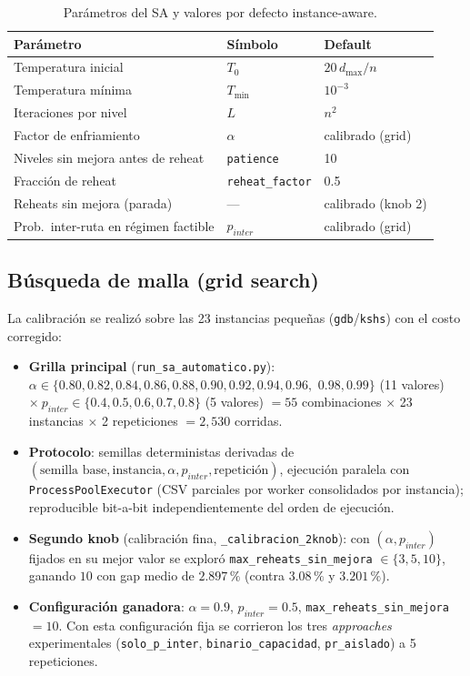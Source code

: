 \begin{table}[htbp]
\centering
\caption{Parámetros del SA y valores por defecto instance-aware.}
\begin{tabular}{lll}
\toprule
Parámetro & Símbolo & Default \\
\midrule
Temperatura inicial & $T_0$ & $20\, d_{\max}/n$ \\
Temperatura mínima & $T_{\min}$ & $10^{-3}$ \\
Iteraciones por nivel & $L$ & $n^2$ \\
Factor de enfriamiento & $\alpha$ & calibrado (grid) \\
Niveles sin mejora antes de reheat & \texttt{patience} & 10 \\
Fracción de reheat & \texttt{reheat\_factor} & 0.5 \\
Reheats sin mejora (parada) & --- & calibrado (knob 2) \\
Prob.\ inter-ruta en régimen factible & $p_{inter}$ & calibrado (grid) \\
\bottomrule
\end{tabular}
\end{table}

\subsection{Búsqueda de malla (grid search)}
\label{subsec:sa-grid}
La calibración se realizó sobre las 23 instancias pequeñas
(\texttt{gdb}/\texttt{kshs}) con el costo corregido:

\begin{itemize}
  \item \textbf{Grilla principal} (\texttt{run\_sa\_automatico.py}):
    $\alpha \in \{0.80, 0.82, 0.84, 0.86, 0.88, 0.90, 0.92, 0.94, 0.96,$
    $0.98, 0.99\}$ (11 valores) $\times\ p_{inter} \in \{0.4, 0.5, 0.6, 0.7,
    0.8\}$ (5 valores) $= 55$ combinaciones $\times$ 23 instancias $\times$ 2
    repeticiones $= 2{,}530$ corridas.
  \item \textbf{Protocolo}: semillas deterministas derivadas de
    $(\text{semilla base}, \text{instancia}, \alpha, p_{inter},
    \text{repetición})$, ejecución paralela con \texttt{ProcessPoolExecutor}
    (CSV parciales por worker consolidados por instancia); reproducible
    bit-a-bit independientemente del orden de ejecución.
  \item \textbf{Segundo knob} (calibración fina, \texttt{\_calibracion\_2knob}):
    con $(\alpha, p_{inter})$ fijados en su mejor valor se exploró
    \texttt{max\_reheats\_sin\_mejora} $\in \{3, 5, 10\}$, ganando $10$ con gap
    medio de $2.897\,\%$ (contra $3.08\,\%$ y $3.201\,\%$).
  \item \textbf{Configuración ganadora}: $\alpha = 0.9$, $p_{inter} = 0.5$,
    \texttt{max\_reheats\_sin\_mejora} $= 10$. Con esta configuración fija se
    corrieron los tres \emph{approaches} experimentales
    (\texttt{solo\_p\_inter}, \texttt{binario\_capacidad},
    \texttt{pr\_aislado}) a 5 repeticiones.
\end{itemize}

